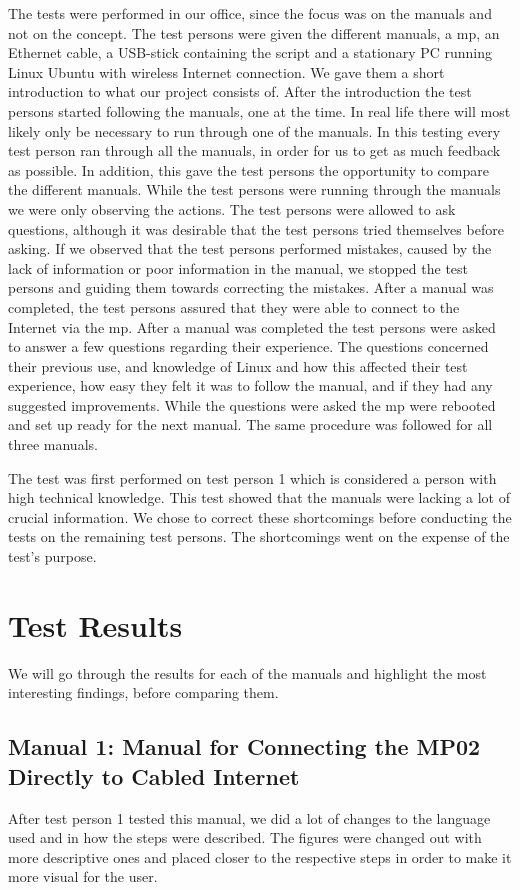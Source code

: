The tests were performed in our office, since the focus was on the manuals and not on the concept. The test persons were given the different manuals, a \gls{mp}, an Ethernet cable, a USB-stick containing the script and a stationary PC running Linux Ubuntu with wireless Internet connection. We gave them a short introduction to what our project consists of. After the introduction the test persons started following the manuals, one at the time. In real life there will most likely only be necessary to run through one of the manuals. In this testing every test person ran through all the manuals, in order for us to get as much feedback as possible. In addition, this gave the test persons the opportunity to compare the different manuals. While the test persons were running through the manuals we were only observing the actions. The test persons were allowed to ask questions, although it was desirable that the test persons tried themselves before asking. If we observed that the test persons performed mistakes, caused by the lack of information or poor information in the manual, we stopped the test persons and guiding them towards correcting the mistakes. After a manual was completed, the test persons assured that they were able to connect to the Internet via the \gls{mp}. After a manual was completed the test persons were asked to answer a few questions regarding their experience. The questions concerned their previous use, and knowledge of Linux and how this affected their test experience, how easy they felt it was to follow the manual, and if they had any suggested improvements.
While the questions were asked the \gls{mp} were rebooted and set up ready for the next manual. The same procedure was followed for all three  manuals. 

The test was first performed on test person 1 which is considered a person with high technical knowledge. This test showed that the manuals were lacking a lot of crucial information. We chose to correct these shortcomings before conducting the tests on the remaining test persons. The shortcomings went on the expense of the test's purpose. 

\section{Test Results}
We will go through the results for each of the manuals and highlight the most interesting findings, before comparing them. 
 
\subsection{Manual 1: Manual for Connecting the MP02 Directly to Cabled Internet}
After test person 1 tested this manual, we did a lot of changes to the language used and in how the steps were described. The figures were changed out with more descriptive ones and placed closer to the respective steps in order to make it more visual for the user. 

